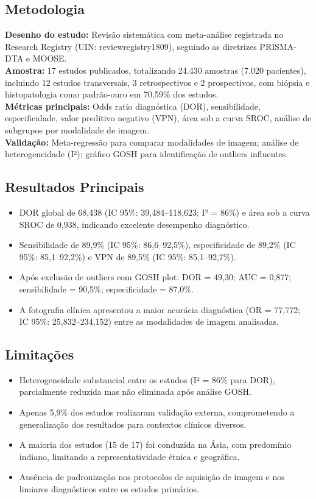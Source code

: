 \subsection{Metodologia}
\textbf{Desenho do estudo:} Revisão sistemática com meta-análise registrada
no Research Registry (UIN: reviewregistry1809), seguindo as diretrizes
PRISMA-DTA e MOOSE. \\
\textbf{Amostra:} 17 estudos publicados, totalizando 24.430 amostras
(7.020 pacientes), incluindo 12 estudos transversais, 3 retrospectivos e
2 prospectivos, com biópsia e histopatologia como padrão-ouro em 70,59\%
dos estudos. \\
\textbf{Métricas principais:} Odds ratio diagnóstica (DOR), sensibilidade,
especificidade, valor preditivo negativo (VPN), área sob a curva SROC,
análise de subgrupos por modalidade de imagem. \\
\textbf{Validação:} Meta-regressão para comparar modalidades de imagem;
análise de heterogeneidade (I²); gráfico GOSH para identificação de outliers
influentes.

\subsection{Resultados Principais}
\begin{itemize}
  \item DOR global de 68,438 (IC 95\%: 39,484--118,623; I² = 86\%) e área
        sob a curva SROC de 0,938, indicando excelente desempenho diagnóstico.
  \item Sensibilidade de 89,9\% (IC 95\%: 86,6--92,5\%), especificidade de
        89,2\% (IC 95\%: 85,1--92,2\%) e VPN de 89,5\% (IC 95\%: 85,1--92,7\%).
  \item Após exclusão de outliers com GOSH plot: DOR = 49,30; AUC = 0,877;
        sensibilidade = 90,5\%; especificidade = 87,0\%.
  \item A fotografia clínica apresentou a maior acurácia diagnóstica
        (OR = 77,772; IC 95\%: 25,832--234,152) entre as modalidades de
        imagem analisadas.
\end{itemize}

\subsection{Limitações}
\begin{itemize}
  \item Heterogeneidade substancial entre os estudos (I² = 86\% para DOR),
        parcialmente reduzida mas não eliminada após análise GOSH.
  \item Apenas 5,9\% dos estudos realizaram validação externa, comprometendo
        a generalização dos resultados para contextos clínicos diversos.
  \item A maioria dos estudos (15 de 17) foi conduzida na Ásia, com
        predomínio indiano, limitando a representatividade étnica e geográfica.
  \item Ausência de padronização nos protocolos de aquisição de imagem e
        nos limiares diagnósticos entre os estudos primários.
\end{itemize}

